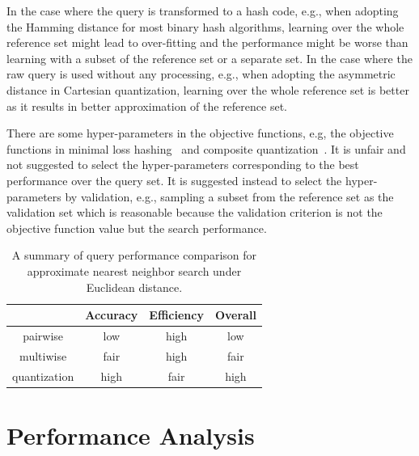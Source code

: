 \documentclass[10pt,journal,compsoc]{IEEEtran}
\begin{document}
In the case where the query is transformed to a hash code,
e.g., when adopting the Hamming distance for most binary hash algorithms,
learning over the whole reference set might lead to over-fitting
and the performance might be worse than learning
with a subset of the reference set
or a separate set.
In the case where the raw query is used without any processing,
e.g., when adopting the asymmetric distance in Cartesian quantization,
learning over the whole reference set is better
as it results in better approximation
of the reference set.

There are some hyper-parameters in the objective functions,
e.g, the objective functions in minimal loss hashing~\cite{NorouziF11} and composite quantization~\cite{ZhangDW14}.
It is unfair and not suggested
to select the hyper-parameters
corresponding to the best performance over the query set.
It is suggested instead
to select the hyper-parameters by validation,
e.g., sampling a subset from the reference set as the validation set
which is reasonable
because the validation criterion is not the objective
function value but the search performance.






\begin{table}[!t]
\caption{A summary of query performance comparison
for approximate nearest neighbor search
under Euclidean distance.}
\vspace{-.3cm}
\label{table:queryperformance}
\centering
\begin{tabular}{|c||c|c|c|}
\hline
 & Accuracy & Efficiency & Overall  \\
\hline
pairwise & low & high & low \\
multiwise & fair & high & fair \\
quantization & high & fair & high \\
\hline
\end{tabular}
\vspace{-.3cm}
\end{table}




\section{Performance Analysis}
\label{sec:discussion}
\end{document}
